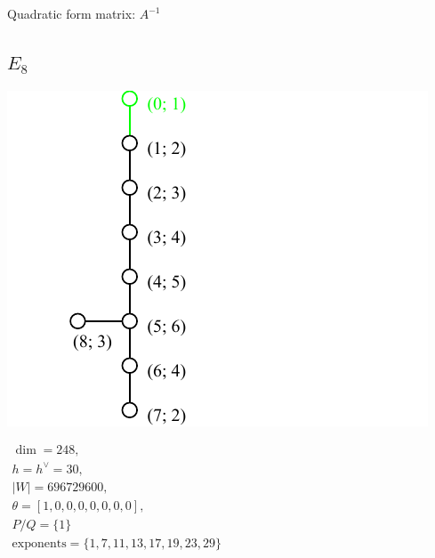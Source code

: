 \documentclass[12pt]{article}
\newcommand{\hc}{h^{\vee}}
\begin{document}
Quadratic form matrix: $A^{-1}$

%
%
\newpage
%
\subsection*{$E_8$}
\parbox{8cm}{\includegraphics{lie_E8.pdf}}
$
\begin{array}{l}
 \dim = 248, \\
  h=\hc= 30,\\
 |W|= 696729600,\\
 \theta=[1,0,0,0,0,0,0,0],\\
 P/Q=\{1\} \\
 \text{exponents}={\{1,7,11,13,17,19,23,29\}}
\end{array}
$
\end{document}
